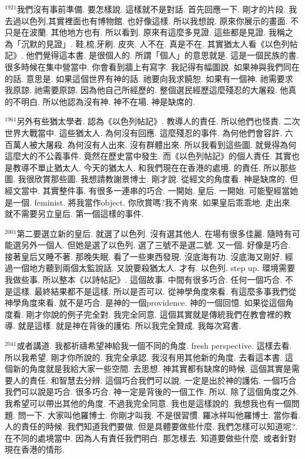 \documentclass{book}
\begin{document}
$^{1921}$我們沒有事前準備.
要怎樣說.
這樣就不是對話.
首先回應一下.
剛才的片段.
我去過以色列,其實裡面也有博物館.
也好像這樣.
所以我想說.
原來你展示的畫面.
不只是在波蘭.
其他地方也有.
所以看到.
原來有這麼多見證.
這些都是見證.
我稱之為「沉默的見證」.
鞋,梳,牙刷.
皮夾.
人不在.
真是不在.
其實猶太人看《以色列帖記》.
他們覺得這本書.
是很個人的.
所謂「個人」的意思就是.
這是一個民族的書.
很多時候在集中營當中.
你會看到牆上有寫字.
我記得有幅圖說.
如果神與我們同在的話.
意思是.
如果這個世界有神的話.
祂要向我求饒恕.
如果有一個神.
祂需要求我原諒.
祂需要原諒.
因為他自己所經歷的.
整個選民經歷這麼殘忍的大屠殺.
他真的不明白.
所以他認為沒有神.
神不在場.
神是缺席的.

$^{1961}$另外有些猶太學者.
認為《以色列帖記》.
教導人的責任.
所以他們也怪責.
二次世界大戰當中.
這些猶太人.
為何沒有回應.
這麼殘忍的事件.
為何他們會容許.
六百萬人被大屠殺.
為何沒有人出來.
沒有群體出來.
所以我看到這些圖.
就覺得為何這麼大的不公義事件.
竟然在歷史當中發生.
而《以色列帖記》的個人責任.
其實也是教導不單止猶太人.
今天的猶太人.
和我們現在在香港的處境.
的責任.
所以那些圖.
我很欣賞那些圖.
我想請教謝景博士.
剛才說.
從經文的角度看.
神是缺席的.
但經文當中.
其實整件事.
有很多一連串的巧合.
一開始.
皇后.
一開始.
可能聖經當她是一個.
feminist.
將我當作object.
你欣賞嗎?我不肯來.
如果皇后乖乖地.
走出來.
就不需要另立皇后.
第一個這樣的事件.

$^{2001}$第二要選立新的皇后.
就選了以色列.
沒有選其他人.
在場有很多佳麗.
隨時有可能選另外一個人.
但她是選了以色列.
選了三號不是選二號.
又一個.
好像是巧合.
接著皇后又睡不著.
那晚失眠.
看了一些東西發現.
沒底海有功.
沒底海又剛好.
經過一個地方聽到兩個太監說話.
又說要殺猶太人.
才有.
以色列.
step up.
環境需要我做些事.
所以整本《以詩帖記》.
這個故事.
中間有很多巧合.
任何一個巧合.
不是這樣.
最終結果都不是這樣.
所以是否可以.
從神學角度來看.
有這麼多事我們從神學角度來看.
就不是巧合.
是神的一個providence.
神的一個回憶.
如果從這個角度看.
剛才你說的例子完全對.
我完全同意.
這個其實就是傳統我們在教會裡的教導.
就是這樣.
就是神在背後的護佑.
所以我完全贊成.
我每次寫書.

$^{2041}$或者講道.
我都祈禱希望神給我一個不同的角度.
fresh perspective.
這樣去看.
所以我希望.
剛才你所說的.
我完全承認.
我沒有用其他新的角度.
去看這本書.
這個新的角度就是我給大家一些空間.
去思想.
神其實都有缺席的時候.
這個其實是需要人的責任.
和智慧去分辨.
這個巧合我們可以說.
一定是出於神的護佑.
一個巧合我們可以說是巧合.
很多巧合.
神一定是背後的一個工作.
所以.
除了這個角度之外.
我希望可以帶出其他的角度.
不過我完全同意.
我也是這樣說的.
我想我也有一個問題.
問一下.
大家叫他羅博士.
你剛才叫我.
不是很習慣.
羅冰祥叫他羅博士.
當你看.
人的責任的時候.
我們知道我們要做.
但是具體要做些什麼.
我們怎樣可以知道呢?.
在不同的處境當中.
因為人有責任我們明白.
那怎樣去.
知道要做些什麼.
或者針對現在香港的情形.
\end{document}
